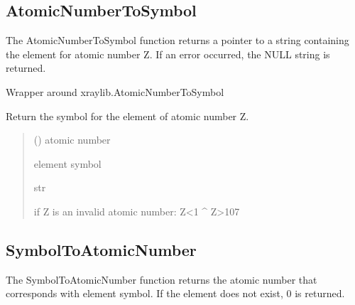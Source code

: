 \documentclass[letterpaper,10pt,english,openany,oneside]{sphinxmanual}
\begin{document}
\subsection{AtomicNumberToSymbol}
\label{\detokenize{api/compound_parser:atomicnumbertosymbol}}
\sphinxAtStartPar
The AtomicNumberToSymbol function returns a pointer to a string containing the
element for atomic number Z. If an error occurred, the NULL string is returned.

\begin{fulllineitems}
\label{\detokenize{api/compound_parser:dxraylib.AtomicNumberToSymbol}}
\pysigstartsignatures
{}
\pysigstopsignatures
\sphinxAtStartPar
Wrapper around xraylib.AtomicNumberToSymbol

\sphinxAtStartPar
Return the symbol for the element of atomic number Z.
\begin{quote}\begin{description}
\sphinxAtStartPar
{} () \textendash{} atomic number

\sphinxAtStartPar
element symbol

\sphinxAtStartPar
str

\sphinxAtStartPar
{} \textendash{} if Z is an invalid atomic number: Z\textless{}1 \textasciicircum{} Z\textgreater{}107

\end{description}\end{quote}

\end{fulllineitems}



\subsection{SymbolToAtomicNumber}
\label{\detokenize{api/compound_parser:symboltoatomicnumber}}
\sphinxAtStartPar
The SymbolToAtomicNumber function returns the atomic number that corresponds
with element symbol. If the element does not exist, 0 is returned.
\end{document}
